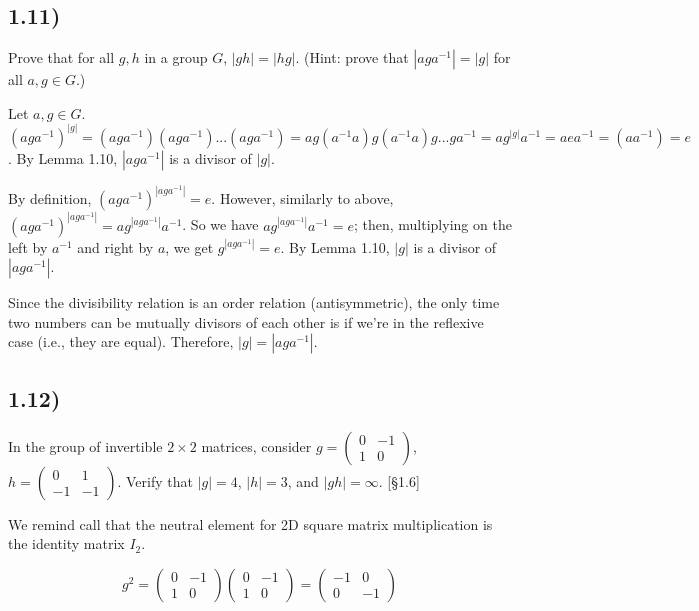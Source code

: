 \subsection*{1.11)}

Prove that for all $g, h$ in a group $G$, $|gh| = |hg|$. (Hint: prove that $|aga^{-1}| = |g|$ for all $a, g \in G$.)

Let $a, g \in G$. $(aga^{-1})^{|g|} = (aga^{-1})(aga^{-1})...(aga^{-1}) = ag(a^{-1}a)g(a^{-1}a)g...ga^{-1} = ag^{|g|}a^{-1} = aea^{-1} = (aa^{-1}) = e$. By Lemma 1.10, $|aga^{-1}|$ is a divisor of $|g|$.

By definition, $(aga^{-1})^{|aga^{-1}|} = e$. However, similarly to above, $(aga^{-1})^{|aga^{-1}|} = ag^{|aga^{-1}|}a^{-1}$. So we have $ag^{|aga^{-1}|}a^{-1} = e$; then, multiplying on the left by $a^{-1}$ and right by $a$, we get $g^{|aga^{-1}|} = e$. By Lemma 1.10, $|g|$ is a divisor of $|aga^{-1}|$.

Since the divisibility relation is an order relation (antisymmetric), the only time two numbers can be mutually divisors of each other is if we're in the reflexive case (i.e., they are equal). Therefore, $|g| = |aga^{-1}|$.



\subsection*{1.12)}

In the group of invertible $2 \times 2$ matrices, consider $g = \begin{pmatrix} 0 & -1 \\ 1 & 0 \end{pmatrix}$, $h = \begin{pmatrix} 0 & 1 \\ -1 & -1 \end{pmatrix}$. Verify that $|g| = 4$, $|h| = 3$, and $|gh| = \infty$. [§1.6]

We remind call that the neutral element for 2D square matrix multiplication is the identity matrix $I_2$.

$$
g^2 = \begin{pmatrix} 0 & -1 \\ 1 & 0 \end{pmatrix} \begin{pmatrix} 0 & -1 \\ 1 & 0 \end{pmatrix}
    = \begin{pmatrix} -1 & 0 \\ 0 & -1 \end{pmatrix}
$$

